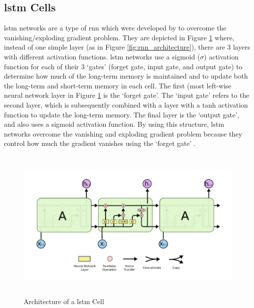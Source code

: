 \subsection{\acrlong{lstm} Cells}\label{sec:background_lstms}
\acrfull{lstm} networks are a type of \acrlong{rnn} which were developed by \citet{hochreiter1997long} to overcome the vanishing/exploding gradient problem. They are depicted in Figure \ref{fig:lstm_architecture} where, instead of one simple layer (as in Figure \ref{fig:rnn_architecture}), there are 3 layers with different activation functions. \acrshort{lstm} networks use a sigmoid ($\sigma$) activation function for each of their 3 `gates' (forget gate, input gate, and output gate) to determine how much of the long-term memory is maintained and to update both the long-term and short-term memory in each cell. The first (most left-wise neural network layer in Figure \ref{fig:lstm_architecture} is the `forget gate'. The `input gate' refers to the second layer, which is subsequently combined with a layer with a tanh activation function to update the long-term memory. The final layer is the `output gate', and also uses a sigmoid activation function. By using this structure, \acrshort{lstm} networks overcome the vanishing and exploding gradient problem because they control how much the gradient vanishes using the `forget gate' \citep{Gers}.

\begin{figure}[h]
    \centering
    \includegraphics[height=7.5cm,trim={0 0 0 0cm},clip]{paper/images/lstm.png}
    \caption{Architecture of a \acrlong{lstm} Cell \citep{olah2015understanding}}
    \label{fig:lstm_architecture}
\end{figure}

